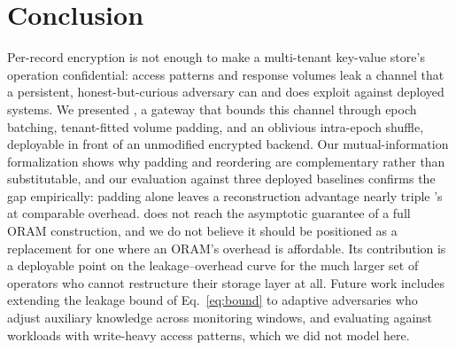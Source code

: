\section{Conclusion}
\label{sec:conclusion}

Per-record encryption is not enough to make a multi-tenant key-value
store's operation confidential: access patterns and response volumes leak
a channel that a persistent, honest-but-curious adversary can and does
exploit against deployed systems. We presented \sysname{}, a gateway that
bounds this channel through epoch batching, tenant-fitted volume padding,
and an oblivious intra-epoch shuffle, deployable in front of an unmodified
encrypted backend. Our mutual-information formalization shows why padding
and reordering are complementary rather than substitutable, and our
evaluation against three deployed baselines confirms the gap empirically:
padding alone leaves a reconstruction advantage nearly triple \sysname's
at comparable overhead. \sysname{} does not reach the asymptotic guarantee
of a full ORAM construction, and we do not believe it should be positioned
as a replacement for one where an ORAM's overhead is affordable. Its
contribution is a deployable point on the leakage--overhead curve for the
much larger set of operators who cannot restructure their storage layer at
all. Future work includes extending the leakage bound of
Eq.~\ref{eq:bound} to adaptive adversaries who adjust auxiliary knowledge
across monitoring windows, and evaluating \sysname{} against workloads with
write-heavy access patterns, which we did not model here.
